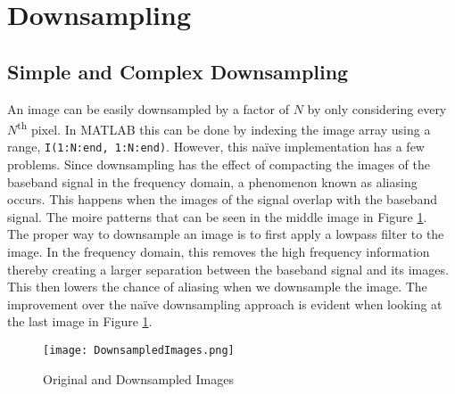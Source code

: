 \section{Downsampling}
\subsection{Simple and Complex Downsampling}
An image can be easily downsampled by a factor of $N$ by only considering every $N$\textsuperscript{th} pixel. In MATLAB this can be done by indexing the image array using a range, \lstinline|I(1:N:end, 1:N:end)|. However, this naïve implementation has a few problems. Since downsampling has the effect of compacting the images of the baseband signal in the frequency domain, a phenomenon known as aliasing occurs. This happens when the images of the signal overlap with the baseband signal. The moire patterns that can be seen in the middle image in Figure \ref{fig:DownsampledImages}. \\
The proper way to downsample an image is to first apply a lowpass filter to the image. In the frequency domain, this removes the high frequency information thereby creating a larger separation between the baseband signal and its images. This then lowers the chance of aliasing when we downsample the image. The improvement over the naïve downsampling approach is evident when looking at the last image in Figure \ref{fig:DownsampledImages}.
\begin{figure}[H]
    \texttt{[image: DownsampledImages.png]}
    \centering
    \caption{Original and Downsampled Images}
    \label{fig:DownsampledImages}
\end{figure}